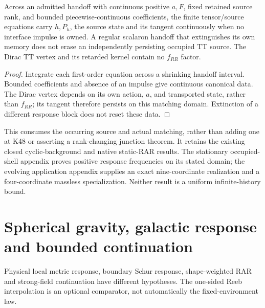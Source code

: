 \documentclass[12pt,a4paper]{article}
\begin{document}
\begin{corollary}
\label{p8:cor:regular-tt-source-inheritance}
Across an admitted handoff with continuous positive $a,F$, fixed retained
source rank, and bounded piecewise-continuous coefficients, the finite
tensor/source equations carry $h,P_h$, the source state and its tangent
continuously when no interface impulse is owned. A regular scalaron
handoff that extinguishes its own memory does not erase an independently
persisting occupied TT source. The Dirac TT vertex and its retarded kernel
contain no $f_{RR}$ factor.
\end{corollary}
\begin{proof}
Integrate each first-order equation across a shrinking handoff interval.
Bounded coefficients and absence of an impulse give continuous canonical
data. The Dirac vertex depends on its own action, $a$, and transported
state, rather than $f_{RR}$; its tangent therefore persists on this
matching domain. Extinction of a different response block does not reset
these data.
\end{proof}
This consumes the occurring source and actual matching, rather than adding
one at K48 or asserting a rank-changing junction theorem. It retains the
existing closed cyclic-background and native static-RAR results. The
stationary occupied-shell appendix proves positive response frequencies
on its stated domain; the evolving application appendix supplies an exact
nine-coordinate realization and a four-coordinate massless specialization.
Neither result is a uniform infinite-history bound.






\section{Spherical gravity, galactic response and bounded continuation}
\label{p6a:sec:organized-a8}
Physical local metric response, boundary Schur response, shape-weighted RAR and strong-field continuation have different hypotheses. The one-sided Reeb interpolation is an optional comparator, not automatically the fixed-environment law.
\end{document}
